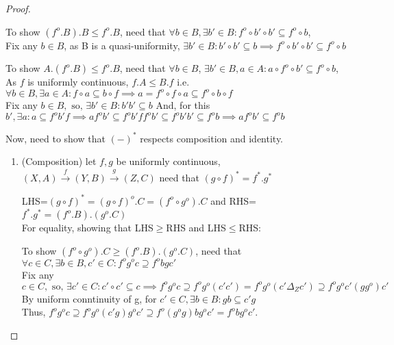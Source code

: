 \documentclass[18pt,a4paper]{article}
\theoremstyle{definition}
\begin{document}
\begin{proof}
\begin{enumerate}[label=(\roman*)]
		\end{enumerate}
	\item	To show $(f^o .B).B \leq f^o .B$, need that $\forall b \in B,
		\exists b' \in B : f^o \circ b' \circ b' \subseteq f^o \circ b$,\\
		Fix any $b \in B$, as B is a quasi-uniformity, $\exists b' \in B : b' \circ b' \subseteq b
		\implies f^o \circ b'\circ b' \subseteq f^o \circ b$

		To show $A.(f^o .B) \leq f^o .B$, need that $\forall b \in B$,
		$\exists b' \in B, a\in A : a \circ f^o \circ b' \subseteq f^o \circ b$,\\
		As $f$ is uniformly continuous, $f.A\leq B.f$ i.e. $\forall b \in B, \exists a \in A
		: f \circ a \subseteq b \circ f
		\implies a= f^o \circ f \circ a \subseteq f^o \circ  b \circ f $   \\
		Fix any $b \in B, \text{ so, } \exists b' \in B : b'b' \subseteq b$
		And, for this $b', \exists a : a \subseteq f^ob'f \implies af^ob' \subseteq f^ob'ff^ob'
		\subseteq f^o b'b' \subseteq f^o b \implies af^ob' \subseteq f^o b$\\
	\item	Now, need to show that $(-)^*$ respects composition and identity.
		\begin{enumerate}[label=(\roman*)]
			\item (Composition) let $f,g$ be uniformly continuous,
				$(X,A) \xrightarrow{f} (Y,B) \xrightarrow{g} (Z,C)$
				need that $(g \circ f)^*= f^*.g^* $

				LHS=$(g \circ f)^*=(g \circ f)^o .C=(f^o \circ g^o).C$ and
				RHS=$f^*.g^* =(f^o .B).(g^o .C)$\\
				For equality, showing that LHS$\geq$RHS and LHS$\leq$RHS:

				To show $(f^o \circ g^o).C\geq(f^o .B).(g^o .C)$, need that
				$\forall c \in C, \exists b \in B, c' \in C : f^og^oc
				\supseteq f^obgc'$ \\
				Fix any $c \in C, \text{ so, } \exists c' \in C: c' \circ c' \subseteq c
				\implies f^o g^o c \supseteq f^o g^o (c'c')
				=f^o g^o (c' \Delta_Z c') \supseteq f^o g^o c'(gg^o)c'$ \\
				By uniform conntinuity of g, for $c'\in C,\exists b\in B: gb\subseteq c'g $
				\\Thus, $f^o g^o c \supseteq f^o g^o (c'g)g^oc' \supseteq
				f^o (g^o g)bg^o c'=f^o bg^o c'$.


\end{enumerate}
\end{proof}
\end{document}
